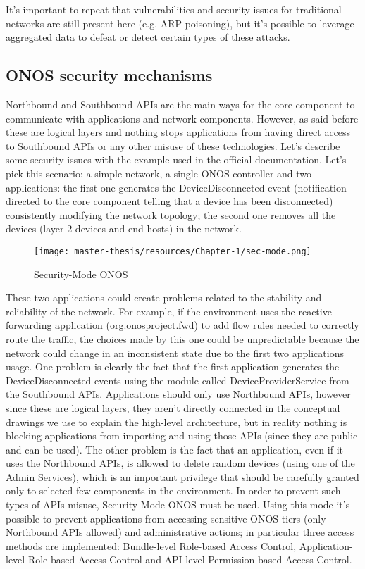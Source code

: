 \documentclass[a4paper,10pt]{memoir}
\begin{document}
It's important to repeat that vulnerabilities and security issues for traditional networks are still present here (e.g. ARP poisoning), but it's possible to leverage aggregated data to defeat or detect certain types of these attacks.

\subsection{ONOS security mechanisms}
Northbound and Southbound APIs are the main ways for the core component to communicate with applications and network components. However, as said before these are logical layers and nothing stops applications from having direct access to Southbound APIs or any other misuse of these technologies. Let's describe some security issues with the example used in the official documentation. Let's pick this scenario: a simple network, a single ONOS controller and two applications: the first one generates the DeviceDisconnected event (notification directed to the core component telling that a device has been disconnected) consistently modifying the network topology; the second one removes all the devices (layer 2 devices and end hosts) in the network.
\begin{wrapfigure}[17]{r}{0.55\textwidth}
\caption{Security-Mode ONOS}
\label{fig:secmode}
\texttt{[image: master-thesis/resources/Chapter-1/sec-mode.png]}
\end{wrapfigure}
These two applications could create problems related to the stability and reliability of the network. For example, if the environment uses the reactive forwarding application (org.onosproject.fwd) to add flow rules needed to correctly route the traffic, the choices made by this one could be unpredictable because the network could change in an inconsistent state due to the first two applications usage. One problem is clearly the fact that the first application generates the DeviceDisconnected events using the module called DeviceProviderService from the Southbound APIs. Applications should only use Northbound APIs, however since these are logical layers, they aren't directly connected in the conceptual drawings we use to explain the high-level architecture, but in reality nothing is blocking applications from importing and using those APIs (since they are public and can be used). The other problem is the fact that an application, even if it uses the Northbound APIs, is allowed to delete random devices (using one of the Admin Services), which is an important privilege that should be carefully granted only to selected few components in the environment. In order to prevent such types of APIs misuse, Security-Mode ONOS must be used. Using this mode it's possible to prevent applications from accessing sensitive ONOS tiers (only Northbound APIs allowed) and administrative actions; in particular three access methods are implemented: Bundle-level Role-based Access Control, Application-level Role-based Access Control and API-level Permission-based Access Control.
\end{document}
